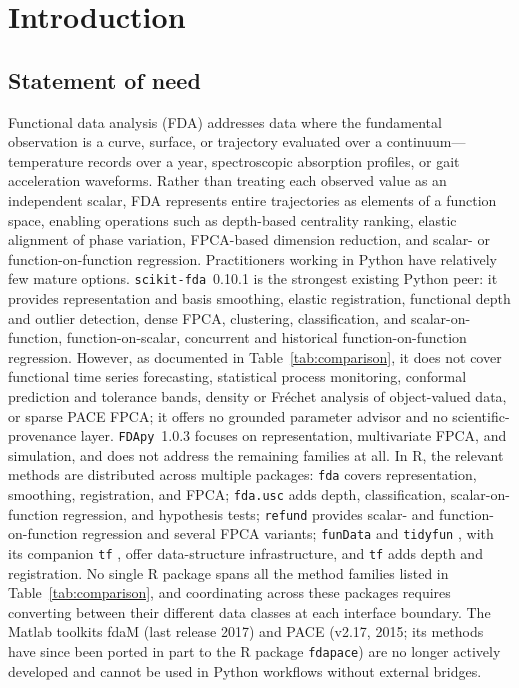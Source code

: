 \section{Introduction}

\subsection*{Statement of need}

Functional data analysis (FDA) addresses data where the fundamental observation
is a curve, surface, or trajectory evaluated over a continuum---temperature
records over a year, spectroscopic absorption profiles, or gait acceleration
waveforms.  Rather than treating each observed value as an independent scalar,
FDA represents entire trajectories as elements of a function space, enabling
operations such as depth-based centrality ranking, elastic alignment of phase
variation, FPCA-based dimension reduction, and scalar- or function-on-function
regression.
Practitioners working in Python have relatively few mature options.
\texttt{scikit-fda}~0.10.1 \citep{ramoscarreno_scikitfda_2024} is the strongest
existing Python peer: it provides representation and basis smoothing, elastic
registration, functional depth and outlier detection, dense FPCA, clustering,
classification, and scalar-on-function, function-on-scalar, concurrent and
historical function-on-function regression.
However, as documented in Table~\ref{tab:comparison}, it does not cover
functional time series forecasting, statistical process monitoring, conformal
prediction and tolerance bands, density or Fr\'{e}chet analysis of
object-valued data, or sparse PACE FPCA; it offers no grounded parameter advisor and no
scientific-provenance layer.
\texttt{FDApy}~1.0.3 \citep{golovkine_fdapy_2025} focuses on representation,
multivariate FPCA, and simulation, and does not address the remaining families
at all.
In R, the relevant methods are distributed across multiple packages: \texttt{fda}
\citep{r_fda,ramsay_hooker_graves_2009} covers representation, smoothing,
registration, and FPCA; \texttt{fda.usc} \citep{febrerobande_fdausc_2012}
adds depth, classification, scalar-on-function regression, and hypothesis
tests; \texttt{refund} \citep{r_refund} provides scalar- and
function-on-function regression and several FPCA variants;
\texttt{funData} \citep{happkurz_fundata_2020} and \texttt{tidyfun}
\citep{r_tidyfun}, with its companion \texttt{tf} \citep{r_tf}, offer
data-structure infrastructure, and \texttt{tf} adds depth and registration.
No single R package spans all the method families listed in
Table~\ref{tab:comparison}, and coordinating across these packages requires
converting between their different data classes at each interface boundary.
The Matlab toolkits fdaM \citep{ramsay_hooker_graves_2009} (last release 2017)
and PACE \citep{yao_muller_wang_2005} (v2.17, 2015; its methods have since been
ported in part to the R package \texttt{fdapace}) are no longer actively
developed and cannot be used in Python workflows without external bridges.

